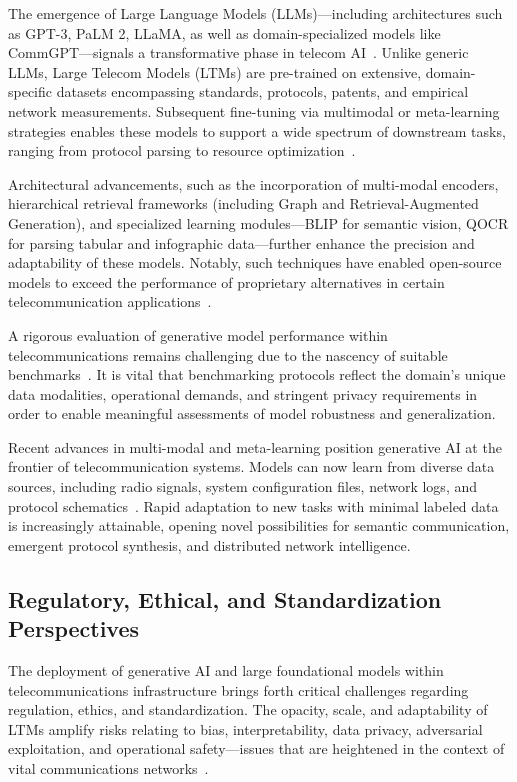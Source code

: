 \documentclass[sigconf]{acmart}
\begin{document}
The emergence of Large Language Models (LLMs)—including architectures such as GPT-3, PaLM 2, LLaMA, as well as domain-specialized models like CommGPT—signals a transformative phase in telecom AI~\cite{ref26,ref33}. Unlike generic LLMs, Large Telecom Models (LTMs) are pre-trained on extensive, domain-specific datasets encompassing standards, protocols, patents, and empirical network measurements. Subsequent fine-tuning via multimodal or meta-learning strategies enables these models to support a wide spectrum of downstream tasks, ranging from protocol parsing to resource optimization~\cite{ref26,ref33}. 

Architectural advancements, such as the incorporation of multi-modal encoders, hierarchical retrieval frameworks (including Graph and Retrieval-Augmented Generation), and specialized learning modules—BLIP for semantic vision, QOCR for parsing tabular and infographic data—further enhance the precision and adaptability of these models. Notably, such techniques have enabled open-source models to exceed the performance of proprietary alternatives in certain telecommunication applications~\cite{ref26}.

A rigorous evaluation of generative model performance within telecommunications remains challenging due to the nascency of suitable benchmarks~\cite{ref7,ref13,ref21,ref26,ref33}. It is vital that benchmarking protocols reflect the domain's unique data modalities, operational demands, and stringent privacy requirements in order to enable meaningful assessments of model robustness and generalization.

Recent advances in multi-modal and meta-learning position generative AI at the frontier of telecommunication systems. Models can now learn from diverse data sources, including radio signals, system configuration files, network logs, and protocol schematics~\cite{ref44}. Rapid adaptation to new tasks with minimal labeled data is increasingly attainable, opening novel possibilities for semantic communication, emergent protocol synthesis, and distributed network intelligence.

\subsection{Regulatory, Ethical, and Standardization Perspectives}

The deployment of generative AI and large foundational models within telecommunications infrastructure brings forth critical challenges regarding regulation, ethics, and standardization. The opacity, scale, and adaptability of LTMs amplify risks relating to bias, interpretability, data privacy, adversarial exploitation, and operational safety—issues that are heightened in the context of vital communications networks~\cite{ref33,ref44}.
\end{document}
